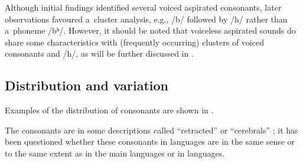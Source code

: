 Although initial findings identified several voiced aspirated consonants, later observations favoured a~cluster analysis, e.g., /b/ followed by /h/ rather than a~phoneme /bʰ/. However, it should be noted that voiceless aspirated sounds do share some characteristics with (frequently occurring) clusters of voiced consonants and /h/, as will be further discussed in .

\subsection{Distribution and variation}
\label{subsec:3-1-1}

Examples of the distribution of consonants are shown in . 


The  consonants are in some descriptions called ``retracted'' \citep[16]{schmidtkohistani2008} or ``cerebrals'' \citep{morgenstierne1941}; it has been questioned whether these consonants in \iliHKIA languages are  in the same sense or to the same extent as in the main \iliNIA languages or in \iliDravidian languages. 


